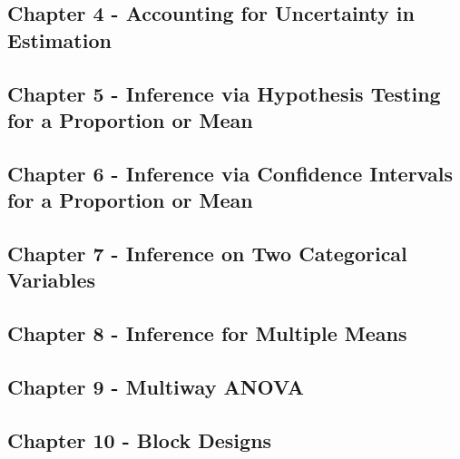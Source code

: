 \documentclass[]{book}
\begin{document}
\hypertarget{chapter-4---accounting-for-uncertainty-in-estimation}{%
\subsection{Chapter 4 - Accounting for Uncertainty in Estimation}\label{chapter-4---accounting-for-uncertainty-in-estimation}}

\hypertarget{chapter-5---inference-via-hypothesis-testing-for-a-proportion-or-mean}{%
\subsection{Chapter 5 - Inference via Hypothesis Testing for a Proportion or Mean}\label{chapter-5---inference-via-hypothesis-testing-for-a-proportion-or-mean}}

\hypertarget{chapter-6---inference-via-confidence-intervals-for-a-proportion-or-mean}{%
\subsection{Chapter 6 - Inference via Confidence Intervals for a Proportion or Mean}\label{chapter-6---inference-via-confidence-intervals-for-a-proportion-or-mean}}

\hypertarget{chapter-7---inference-on-two-categorical-variables}{%
\subsection{Chapter 7 - Inference on Two Categorical Variables}\label{chapter-7---inference-on-two-categorical-variables}}

\hypertarget{chapter-8---inference-for-multiple-means}{%
\subsection{Chapter 8 - Inference for Multiple Means}\label{chapter-8---inference-for-multiple-means}}

\hypertarget{chapter-9---multiway-anova}{%
\subsection{Chapter 9 - Multiway ANOVA}\label{chapter-9---multiway-anova}}

\hypertarget{chapter-10---block-designs}{%
\subsection{Chapter 10 - Block Designs}\label{chapter-10---block-designs}}
\end{document}
